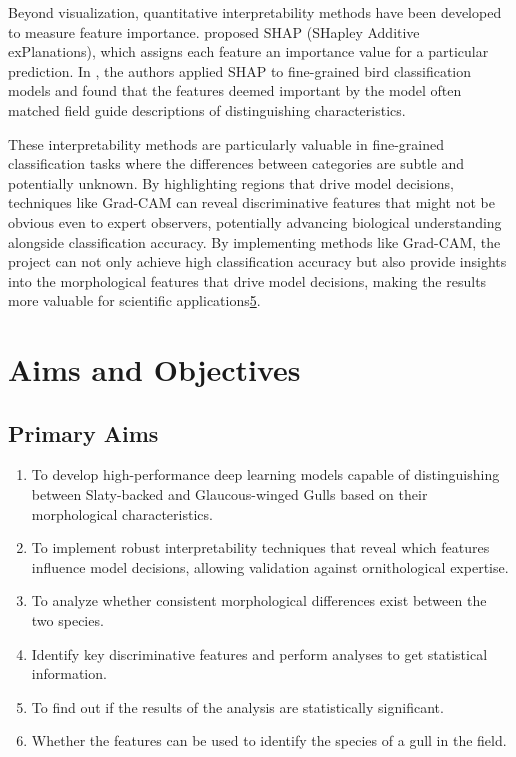 \documentclass[a4paper,12pt]{report}
\begin{document}
Beyond visualization, quantitative interpretability methods have been developed to measure feature importance. \citep{lundberg2017unified} proposed SHAP (SHapley Additive exPlanations), which assigns each feature an importance value for a particular prediction. In \citep{chen2019looks}, the authors applied SHAP to fine-grained bird classification models and found that the features deemed important by the model often matched field guide descriptions of distinguishing characteristics.

These interpretability methods are particularly valuable in fine-grained classification tasks where the differences between categories are subtle and potentially unknown. By highlighting regions that drive model decisions, techniques like Grad-CAM can reveal discriminative features that might not be obvious even to expert observers, potentially advancing biological understanding alongside classification accuracy. By implementing methods like Grad-CAM, the project can not only achieve high classification accuracy but also provide insights into the morphological features that drive model decisions, making the results more valuable for scientific applications\href{https://www.atlantis-press.com/article/125986223.pdf}{5}.


\chapter{Aims and Objectives}

\section{Primary Aims}
\begin{enumerate}
    \item To develop high-performance deep learning models capable of distinguishing between Slaty-backed and Glaucous-winged Gulls based on their morphological characteristics.
    \item To implement robust interpretability techniques that reveal which features influence model decisions, allowing validation against ornithological expertise.
    \item To analyze whether consistent morphological differences exist between the two species. 
    \item Identify key discriminative features and perform analyses to get statistical information.
    \item To find out if the results of the analysis are statistically significant.
    \item Whether the features can be used to identify the species of a gull in the field.
\end{enumerate}
\end{document}
